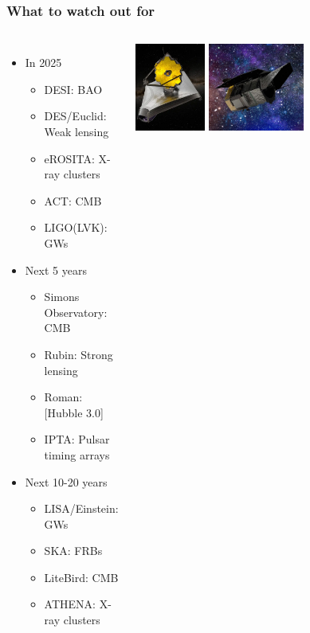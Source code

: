 \documentclass[aspectratio=169]{beamer}
\begin{document}
\begin{frame}
    \frametitle{What to watch out for}
    \begin{columns}
        \begin{itemize}
            \item In 2025
                \begin{itemize}
                    \item DESI: BAO
                    \item DES/Euclid: Weak lensing
                    \item eROSITA: X-ray clusters
                    \item ACT: CMB
                    \item LIGO(LVK): GWs
                \end{itemize}
            \item Next 5 years
                \begin{itemize}
                    \item Simons Observatory: CMB
                    \item Rubin: Strong lensing
                    \item Roman: [Hubble 3.0]
                    \item IPTA: Pulsar timing arrays
                \end{itemize}
            \item Next 10-20 years
                \begin{itemize}
                    \item LISA/Einstein: GWs
                    \item SKA: FRBs
                    \item LiteBird: CMB
                    \item ATHENA: X-ray clusters
                \end{itemize}
        \end{itemize}
        \includegraphics[height=0.145\textwidth]{figures/telescopes/jwst.png}%
        \includegraphics[height=0.145\textwidth]{figures/telescopes/roman.jpg}%

\end{columns}
\end{frame}
\end{document}
